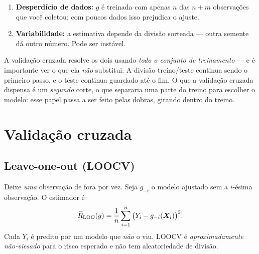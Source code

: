 \documentclass[11pt,a4paper]{article}
\begin{document}
\begin{atencao}
\begin{enumerate}[leftmargin=1.5cm,nosep]
  \item \textbf{Desperdício de dados:} $g$ é treinada com apenas $n$ das $n+m$
        observações que você coletou; com poucos dados isso prejudica o ajuste.
  \item \textbf{Variabilidade:} a estimativa depende da divisão sorteada --- outra
        semente dá outro número. Pode ser instável.
\end{enumerate}
A validação cruzada resolve os dois usando \emph{todo o conjunto de treinamento}
--- e é importante ver o que ela \emph{não} substitui. A divisão treino/teste
continua sendo o primeiro passo, e o teste continua guardado até o fim. O que a
validação cruzada dispensa é um \emph{segundo} corte, o que separaria uma parte do
treino para escolher o modelo: esse papel passa a ser feito pelas dobras, girando
dentro do treino.
\end{atencao}

\section{Validação cruzada}
\subsection{Leave-one-out (LOOCV)}
Deixe \emph{uma} observação de fora por vez. Seja $g_{-i}$ o modelo ajustado sem a
$i$-ésima observação. O estimador é
\begin{equation}\label{eq:loocv}
  \widehat{R}_{\text{LOO}}(g) = \frac1n \sum_{i=1}^n \big(Y_i - g_{-i}(\bm{X}_i)\big)^2 .
\end{equation}
Cada $Y_i$ é predito por um modelo que \emph{não} o viu. LOOCV é
\emph{aproximadamente não-viesado} para o risco esperado e não tem aleatoriedade de
divisão.
\end{document}
